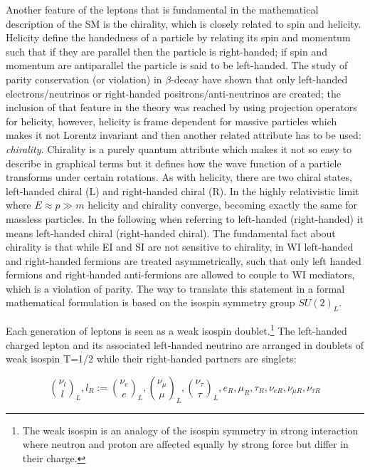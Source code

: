 \noindent Another feature of the leptons that is fundamental in the mathematical description of the SM is the chirality, which is closely related to spin and helicity. Helicity define the handedness of a particle by relating its spin and momentum such that if they are parallel then the particle is right-handed; if spin and momentum are antiparallel the particle is said to be left-handed. The study of parity conservation (or violation) in $\beta$-decay have shown that only left-handed electrons/neutrinos or right-handed positrons/anti-neutrinos are created\cite{goldhaber}; the inclusion of that feature in the theory was reached by using projection operators for helicity, however, helicity is frame dependent for massive particles which makes it not Lorentz invariant and then another related attribute has to be used: \textit{chirality}. Chirality is a purely quantum attribute which makes it not so easy to describe in graphical terms but it defines how the wave function of a particle transforms under certain rotations. As with helicity, there are two chiral states, left-handed chiral (L) and right-handed chiral (R). In the highly relativistic limit where $E\approx p \gg m$ helicity and chirality converge, becoming exactly the same for massless particles.
\noindent In the following when referring to left-handed (right-handed) it means left-handed chiral (right-handed chiral). The fundamental fact about chirality is that while EI and SI are not sensitive to chirality, in WI left-handed and right-handed fermions are treated asymmetrically, such that only left handed fermions and right-handed anti-fermions are allowed to couple to WI mediators, which is a violation of parity. The way to translate this statement in a formal mathematical formulation is based on the isospin symmetry group $SU(2)_L$.   

\noindent Each generation of leptons is seen as a weak isospin doublet.\footnote{The weak isospin is an analogy of the isospin symmetry in strong interaction where neutron and proton are affected equally by strong force but differ in their charge.} The left-handed charged lepton and its associated left-handed neutrino are arranged in doublets of weak isospin T=1/2 while their right-handed partners are singlets:

\begin{equation}
\binom{\nu_l}{l}_L , l_R := \binom{\nu_e}{e}_L , \binom{\nu_\mu}{\mu}_L, \binom{\nu_\tau}{\tau}_L, e_R, \mu_R, \tau_R, \nu_{eR}, \nu_{\mu R}, \nu_{\tau R}
\label{lepton_multiplets}
\end{equation}

